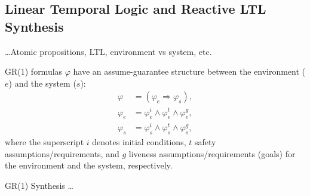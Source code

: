 \subsection{Linear Temporal Logic and Reactive LTL Synthesis}

\ldots Atomic propositions, LTL, environment vs system, etc.

GR(1) formulas $\varphi$ have an assume-guarantee structure between the environment ($e$) and the system ($s$):
\begin{equation}\label{GR1Formula}
\begin{split}
	\varphi &= (\varphi_e \Rightarrow \varphi_s),\\
	\varphi_e &= \varphi_e^i \wedge \varphi_e^t \wedge \varphi_e^g,\\
	\varphi_s &= \varphi_s^i \wedge \varphi_s^t \wedge \varphi_s^g,
\end{split}
\end{equation}
where the superscript $i$ denotes initial conditions, $t$ safety assumptions/requirements, and $g$ liveness assumptions/requirements (goals) for the environment and the system, respectively. 

GR(1) Synthesis \cite{piterman_06} \ldots

